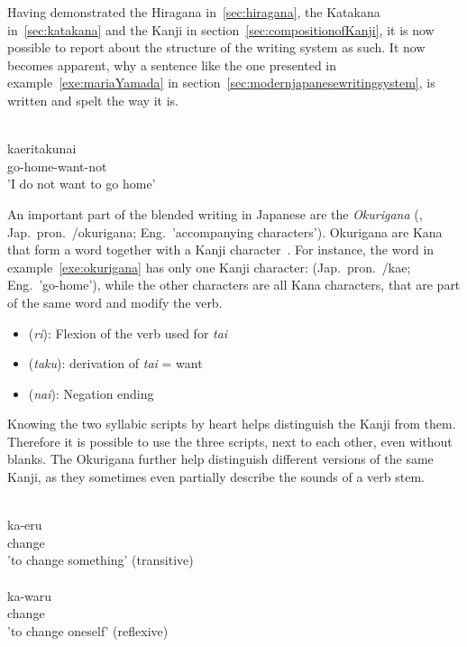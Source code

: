 Having demonstrated the Hiragana in~\ref{sec:hiragana}, the Katakana 
in~\ref{sec:katakana} and the Kanji in section~\ref{sec:compositionofKanji}, 
it is now possible to report about the structure of the writing system as such.
It now becomes apparent, why a sentence like the one presented in 
example~\ref{exe:mariaYamada} in section~\ref{sec:modernjapanesewritingsystem},
is written and spelt the way it is.
\begin{exe}
\ex\label{exe:okurigana}
\gll 
  \\
 kaeritakunai \\
 go-home-want-not \\
\trans 'I do not want to go home' \\
\end{exe}
An important part of the blended writing in Japanese are the 
\emph{Okurigana} (, Jap.~pron.~/okurigana; 
Eng.~'accompanying characters'). Okurigana are Kana that form 
a word together with a Kanji character~.
For instance, the word in example~\ref{exe:okurigana} has only one Kanji 
character:  (Jap.~pron.~/kae; Eng.~'go-home'), while the other characters are all Kana characters, that are part of the same word and modify
the verb.
\begin{itemize}
  \item {} (\emph{ri}): Flexion of the verb used for \emph{tai}
  \item {} (\emph{taku}): derivation of \emph{tai} = want
  \item {} (\emph{nai}): Negation ending
\end{itemize}
Knowing the two syllabic scripts by heart helps distinguish the Kanji from them.
Therefore it is possible to use the three scripts, next to each other, even 
without blanks. The Okurigana further help distinguish different versions of 
the same Kanji, as they sometimes even partially describe the sounds of a 
verb stem.
\begin{exe}
\ex\label{exe:stemspelling}
\begin{xlist}
\ex\label{exe:stemspellingkaeru}
\gll 
  \\
 ka-eru \\
 change \\
\trans 'to change something' (transitive) \\

\ex\label{exe:stemspellingkawaru}
\gll 
  \\
 ka-waru \\
 change \\
\trans 'to change oneself' (reflexive) \\
\end{xlist}
\end{exe}
